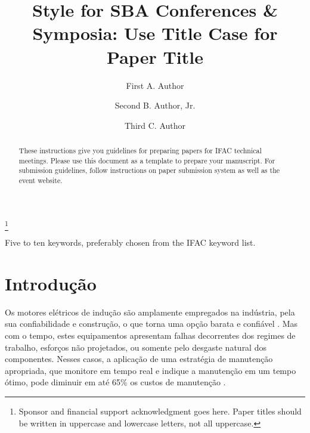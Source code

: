 \documentclass[a4paper]{ifacconf}
\begin{document}
\begin{frontmatter}

\title{Style for SBA Conferences \& Symposia: Use Title Case for
  Paper Title} 

\thanks[footnoteinfo]{Sponsor and financial support acknowledgment
goes here. Paper titles should be written in uppercase and lowercase
letters, not all uppercase.}

\author[First]{First A. Author} 
\author[Second]{Second B. Author, Jr.} 
\author[Third]{Third C. Author}


\address[First]{Faculdade de Engenharia Elétrica, Universidade do Triângulo, MG, (e-mail: autor1@faceg@univt.br).}
\address[Second]{Faculdade de Engenharia de Controle \& Automação, Universidade do Futuro, RJ (e-mail: autor2@feca.unifutu.rj)}
\address[Third]{Electrical Engineering Department, 
   Seoul National University, Seoul, Korea, (e-mail: author3@snu.ac.kr)}
   
\renewcommand{\abstractname}{{\bf Abstract:~}}   
   
\begin{abstract}                %
These instructions give you guidelines for preparing papers for IFAC
technical meetings. Please use this document as a template to prepare
your manuscript. For submission guidelines, follow instructions on
paper submission system as well as the event website.
\end{abstract}

\begin{keyword}
Five to ten keywords, preferably chosen from the IFAC keyword list.
\end{keyword}

\end{frontmatter}
\fi



\section{Introdução}

Os motores elétricos de indução são amplamente empregados na indústria, pela sua confiabilidade e construção, o que torna uma opção 
barata e confiável \citep{Umans2003}. Mas com o tempo, estes equipamentos apresentam falhas decorrentes dos regimes de trabalho, esforços não 
projetados, ou somente pelo desgaste natural dos componentes. Nesses casos, a aplicação de uma estratégia de manutenção apropriada, que
monitore em tempo real e indique a manutenção em um tempo ótimo, pode diminuir em até 65\% os custos de manutenção \citep{Wu2013}. 
\end{document}

